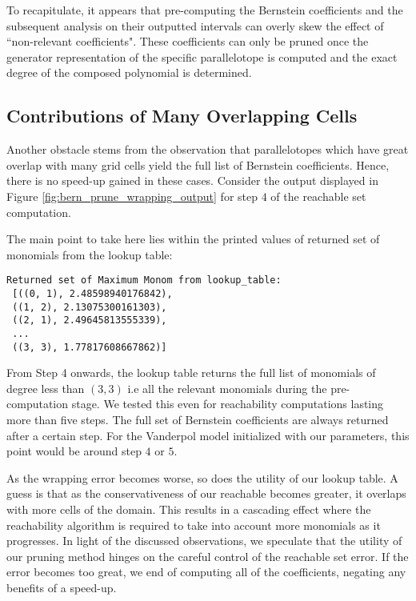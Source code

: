 To recapitulate, it appears that pre-computing the Bernstein coefficients and the subsequent analysis on their outputted intervals can overly skew the effect of ``non-relevant coefficients". These coefficients can only be pruned once the generator representation of the specific parallelotope is computed and the exact degree of the composed polynomial is determined.

\subsection{Contributions of Many Overlapping Cells}
Another obstacle stems from the observation that parallelotopes which have great overlap with many grid cells yield the full list of Bernstein coefficients. Hence, there is no speed-up gained in these cases. Consider the output displayed in Figure \ref{fig:bern_prune_wrapping_output} for step $4$ of the reachable set computation.

The main point to take here lies within the printed values of returned set of monomials from the lookup table:
%
\begin{verbatim}
Returned set of Maximum Monom from lookup_table:
 [((0, 1), 2.48598940176842),
 ((1, 2), 2.13075300161303),
 ((2, 1), 2.49645813555339),
 ...
 ((3, 3), 1.77817608667862)]
\end{verbatim}
%
From Step 4 onwards, the lookup table returns the full list of monomials of degree less than $(3,3)$ i.e all the relevant monomials during the pre-computation stage.
%
We tested this even for reachability computations lasting more than five steps. The full set of Bernstein coefficients are always returned after a certain step. For the Vanderpol model initialized with our parameters, this point would be around step $4$ or $5$.

As the wrapping error becomes worse, so does the utility of our lookup table. A guess is that as the conservativeness of our reachable becomes greater, it overlaps with more cells of the domain. This results in a cascading effect where the reachability algorithm is required to take into account more monomials as it progresses.
%
In light of the discussed observations, we speculate that the utility of our pruning method hinges on the careful control of the reachable set error. If the error becomes too great, we end of computing all of the coefficients, negating any benefits of a speed-up.
